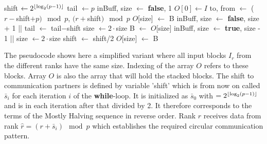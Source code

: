 \begin{algorithm}
	\caption{– Mostly Halving Allgather\\
		\textit{r}: rank Id\\
		\textit{p}: number of processes\\
		\textit{I}: Input array\\
		\textit{O}: Output array} \label{algo:mostlyHalvingAllgather}
	\begin{algorithmic}[1]
		\State shift $\gets 2^{\lfloor\log_2(p-1)\rfloor}$
		\State tail $\gets p$
		\State inBuff, size $\gets$ \textbf{false}, 1
		\State $O[0] \gets I$
		\State to, from $\gets$ ($r - $shift$+p)\mod{p}$, $(r+$shift$)\mod{p}$ 
			  \label{mostlyHalvingAllgather:OnPile}
				\State $O$[size] $\gets$ B
				\State inBuff, size $\gets$ \textbf{false}, size + 1
			\EndIf
			\State {} || 
			\State tail $\gets$ tail$ - $shift
			\State size $\gets 2\cdot$size
		\Else
			  \label{mostlyHalvingAllgather:InBuffer}
				\State B $\gets$ $O$[size]
				\State inBuff, size $\gets$ \textbf{true}, size - 1
			\EndIf
			\State {} || 
			\State size $\gets 2\cdot$size
		\EndIf
		\State shift $\gets$ shift/2
		\EndWhile
		  \label{mostlyHalvingAllgather:lastBlockCopy}
			\State $O$[size] $\gets$ B
		\EndIf
		\State {} 
		\EndProcedure
	\end{algorithmic}
\end{algorithm}
The pseudocode shows here a simplified variant where all input blocks $I_r$ from the different ranks have the same size. Indexing of the array $O$ refers to these blocks. Array $O$ is also the array that will hold the stacked blocks. The shift to communication partners is defined by variable 'shift' which is from now on called $\bar{s}_i$ for each iteration $i$ of the \textbf{while}-loop. It is initialized as $\bar{s}_0$ with $=2^{\lfloor\log_2(p-1)\rfloor}$ and is in each iteration after that divided by 2. It therefore corresponds to the terms of the Mostly Halving sequence in reverse order. Rank $r$ receives data from rank $\hat{r}=(r+\bar{s}_i)\mod{p}$ which establishes the required circular communication pattern.\\
